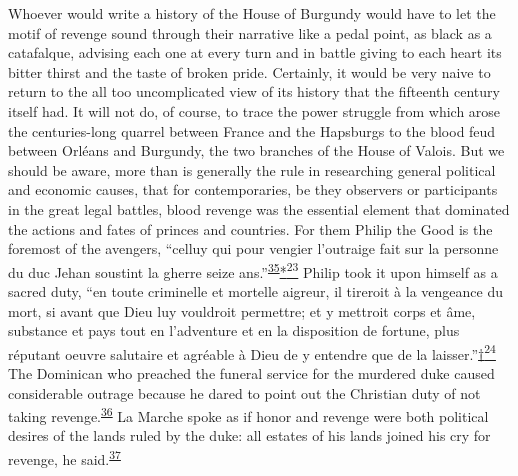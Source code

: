 \protect\hypertarget{08_Chapter_One__THE_PASSIONATE_INTE.xhtmlux5cux23page_16}{}{}Whoever
would write a history of the House of Burgundy would have to let the
motif of revenge sound through their narrative like a pedal point, as
black as a catafalque, advising each one at every turn and in battle
giving to each heart its bitter thirst and the taste of broken pride.
Certainly, it would be very naive to return to the all too uncomplicated
view of its history that the fifteenth century itself had. It will not
do, of course, to trace the power struggle from which arose the
centuries-long quarrel between France and the Hapsburgs to the blood
feud between Orléans and Burgundy, the two branches of the House of
Valois. But we should be aware, more than is generally the rule in
researching general political and economic causes, that for
contemporaries, be they observers or participants in the great legal
battles, blood revenge was the essential element that dominated the
actions and fates of princes and countries. For them Philip the Good is
the foremost of the avengers, ``celluy qui pour vengier l'outraige fait
sur la personne du duc Jehan soustint la gherre seize
ans.''\textsuperscript{\protect\hypertarget{08_Chapter_One__THE_PASSIONATE_INTE.xhtmlux5cux23id_2161}{\protect\hyperlink{23_NOTES.xhtmlux5cux23id_2162}{35}}}\protect\hypertarget{08_Chapter_One__THE_PASSIONATE_INTE.xhtmlux5cux23id_2290}{\protect\hyperlink{23_NOTES.xhtmlux5cux23id_2292}{*\textsuperscript{23}}}
Philip took it upon himself as a sacred duty, ``en toute criminelle et
mortelle aigreur, il tireroit à la vengeance du mort, si avant que Dieu
luy vouldroit permettre; et y mettroit corps et âme, substance et pays
tout en l'adventure et en la disposition de fortune, plus réputant
oeuvre salutaire et agréable à Dieu de y entendre que de la
laisser.''\protect\hypertarget{08_Chapter_One__THE_PASSIONATE_INTE.xhtmlux5cux23id_2296}{\protect\hyperlink{23_NOTES.xhtmlux5cux23id_2295}{†\textsuperscript{24}}}
The Dominican who preached the funeral service for the murdered duke
caused considerable outrage because he dared to point out the Christian
duty of not taking
revenge.\textsuperscript{\protect\hypertarget{08_Chapter_One__THE_PASSIONATE_INTE.xhtmlux5cux23id_2159}{\protect\hyperlink{23_NOTES.xhtmlux5cux23id_2160}{36}}}
La Marche spoke as if honor and revenge were both political desires of
the lands ruled by the duke: all estates of his lands joined his cry for
revenge, he
said.\textsuperscript{\protect\hypertarget{08_Chapter_One__THE_PASSIONATE_INTE.xhtmlux5cux23id_2157}{\protect\hyperlink{23_NOTES.xhtmlux5cux23id_2158}{37}}}

